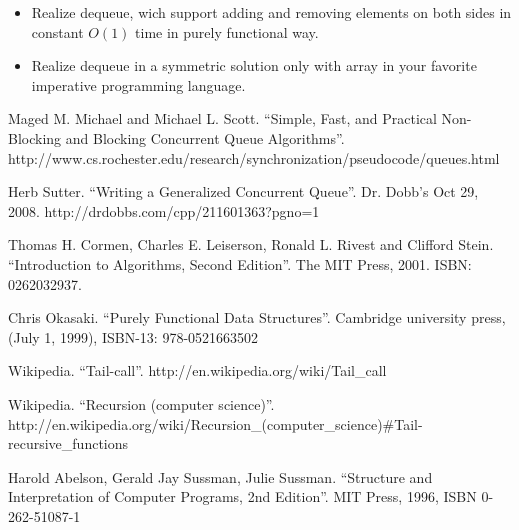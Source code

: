 \documentclass[UTF8]{article}
\begin{document}
\begin{Exercise}
\begin{itemize}
\item Realize dequeue, wich support adding and removing elements on both sides in
constant $O(1)$ time in purely functional way.
\item Realize dequeue in a symmetric solution only with array in your
favorite imperative programming language.
\end{itemize}
\end{Exercise}


\begin{thebibliography}{99}

Maged M. Michael and Michael L. Scott. ``Simple, Fast, and Practical Non-Blocking and Blocking Concurrent Queue Algorithms''. http://www.cs.rochester.edu/research/synchronization/pseudocode/queues.html

Herb Sutter. ``Writing a Generalized Concurrent Queue''. Dr. Dobb's Oct 29, 2008. http://drdobbs.com/cpp/211601363?pgno=1

Thomas H. Cormen, Charles E. Leiserson, Ronald L. Rivest and Clifford Stein. ``Introduction to Algorithms, Second Edition''. The MIT Press, 2001. ISBN: 0262032937.

Chris Okasaki. ``Purely Functional Data Structures''. Cambridge university press, (July 1, 1999), ISBN-13: 978-0521663502

Wikipedia. ``Tail-call''. http://en.wikipedia.org/wiki/Tail\_call

Wikipedia. ``Recursion (computer science)''. http://en.wikipedia.org/wiki/Recursion\_(computer\_science)\#Tail-recursive\_functions

Harold Abelson, Gerald Jay Sussman, Julie Sussman. ``Structure and Interpretation of Computer Programs, 2nd Edition''. MIT Press, 1996, ISBN 0-262-51087-1

\end{thebibliography}

\ifx\wholebook\relax \else
\end{document}
